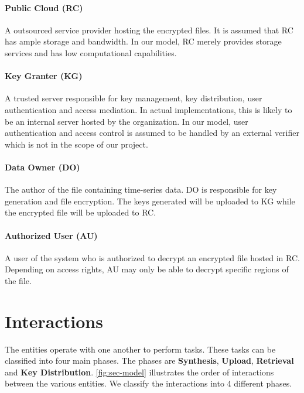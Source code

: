 \documentclass[hyp,a4paper,12pt,openbib]{socreport}
\begin{document}
\paragraph{Public Cloud (RC)} A outsourced service provider hosting the encrypted files. It is assumed that RC has ample storage and bandwidth. In our model, RC merely provides storage services and has low computational capabilities.
\paragraph{Key Granter (KG)} A trusted server responsible for key management, key distribution, user authentication and access mediation. In actual implementations, this is likely to be an internal server hosted by the organization. In our model, user authentication and access control is assumed to be handled by an external verifier which is not in the scope of our project.

\paragraph{Data Owner (DO)} The author of the file containing time-series data. DO is responsible for key generation and file encryption. The keys generated will be uploaded to KG while the encrypted file will be uploaded to RC.
\paragraph{Authorized User (AU)} A user of the system who is authorized to decrypt an encrypted file hosted in RC. Depending on access rights, AU may only be able to decrypt specific regions of the file.


\section{Interactions}
\label{sec:interact}
The entities operate with one another to perform tasks. These tasks can be classified into four main phases. The phases are \textbf{Synthesis}, \textbf{Upload}, \textbf{Retrieval} and \textbf{Key Distribution}. \cref{fig:sec-model} illustrates the order of interactions between the various entities. We classify the interactions into 4 different phases.
\end{document}
